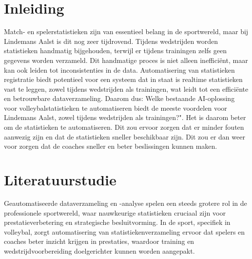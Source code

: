 
\section{Inleiding}%
\label{sec:inleiding}

Match- en spelerstatistieken zijn van essentieel belang in de sportwereld, maar bij Lindemans Aalst is dit nog zeer tijdrovend. Tijdens wedstrijden worden statistieken handmatig bijgehouden, terwijl er tijdens trainingen zelfs geen gegevens worden verzameld. Dit handmatige proces is niet alleen inefficiënt, maar kan ook leiden tot inconsistenties in de data. Automatisering van statistieken registratie biedt potentieel voor een systeem dat in staat is realtime statistieken vast te leggen, zowel tijdens wedstrijden als trainingen, wat leidt tot een efficiënte en betrouwbare dataverzameling. Daarom dus: Welke bestaande AI-oplossing voor volleybalstatistieken te automatiseren biedt de meeste voordelen voor Lindemans Aalst, zowel tijdens wedstrijden als trainingen?". Het is daarom beter om de statistieken te automatiseren. Dit zou ervoor zorgen dat er minder fouten aanwezig zijn en dat de statistieken sneller beschikbaar zijn. Dit zou er dan weer voor zorgen dat de coaches sneller en beter beslissingen kunnen maken.

\section{Literatuurstudie}%
\label{sec:literatuurstudie}
Geautomatiseerde dataverzameling en -analyse spelen een steeds grotere rol in de professionele sportwereld, 
waar nauwkeurige statistieken cruciaal zijn voor prestatieverbetering en strategische besluitvorming. In de 
sport, specifiek in volleybal, zorgt automatisering van statistiekenverzameling ervoor dat spelers en 
coaches beter inzicht krijgen in prestaties, waardoor training en wedstrijdvoorbereiding doelgerichter 
kunnen worden aangepakt. 
